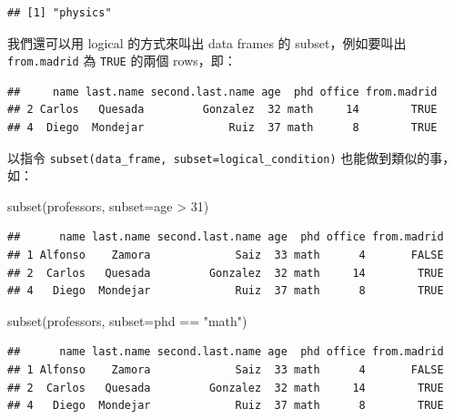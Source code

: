 \documentclass[
]{book}
\newenvironment{Shaded}{\begin{snugshade}}{\end{snugshade}}
\newcommand{\AttributeTok}[1]{\textcolor[rgb]{0.77,0.63,0.00}{#1}}
\newcommand{\DecValTok}[1]{\textcolor[rgb]{0.00,0.00,0.81}{#1}}
\newcommand{\FunctionTok}[1]{\textcolor[rgb]{0.00,0.00,0.00}{#1}}
\newcommand{\NormalTok}[1]{#1}
\newcommand{\OtherTok}[1]{\textcolor[rgb]{0.56,0.35,0.01}{#1}}
\newcommand{\SpecialCharTok}[1]{\textcolor[rgb]{0.00,0.00,0.00}{#1}}
\newcommand{\StringTok}[1]{\textcolor[rgb]{0.31,0.60,0.02}{#1}}
\theoremstyle{definition}
\theoremstyle{remark}
\begin{document}
\begin{verbatim}
## [1] "physics"
\end{verbatim}

我們還可以用 logical 的方式來叫出 data frames 的 subset，例如要叫出 \texttt{from.madrid} 為 \texttt{TRUE} 的兩個 rows，即：

\begin{Shaded}
\end{Shaded}

\begin{verbatim}
##     name last.name second.last.name age  phd office from.madrid
## 2 Carlos   Quesada         Gonzalez  32 math     14        TRUE
## 4  Diego  Mondejar             Ruiz  37 math      8        TRUE
\end{verbatim}

以指令 \texttt{subset(data\_frame,\ subset=logical\_condition)} 也能做到類似的事，如：

\begin{Shaded}
\begin{Highlighting}[]
\FunctionTok{subset}\NormalTok{(professors, }\AttributeTok{subset=}\NormalTok{age }\SpecialCharTok{\textgreater{}} \DecValTok{31}\NormalTok{)}
\end{Highlighting}
\end{Shaded}

\begin{verbatim}
##      name last.name second.last.name age  phd office from.madrid
## 1 Alfonso    Zamora             Saiz  33 math      4       FALSE
## 2  Carlos   Quesada         Gonzalez  32 math     14        TRUE
## 4   Diego  Mondejar             Ruiz  37 math      8        TRUE
\end{verbatim}

\begin{Shaded}
\begin{Highlighting}[]
\FunctionTok{subset}\NormalTok{(professors, }\AttributeTok{subset=}\NormalTok{phd }\SpecialCharTok{==} \StringTok{"math"}\NormalTok{)}
\end{Highlighting}
\end{Shaded}

\begin{verbatim}
##      name last.name second.last.name age  phd office from.madrid
## 1 Alfonso    Zamora             Saiz  33 math      4       FALSE
## 2  Carlos   Quesada         Gonzalez  32 math     14        TRUE
## 4   Diego  Mondejar             Ruiz  37 math      8        TRUE
\end{verbatim}
\end{document}
